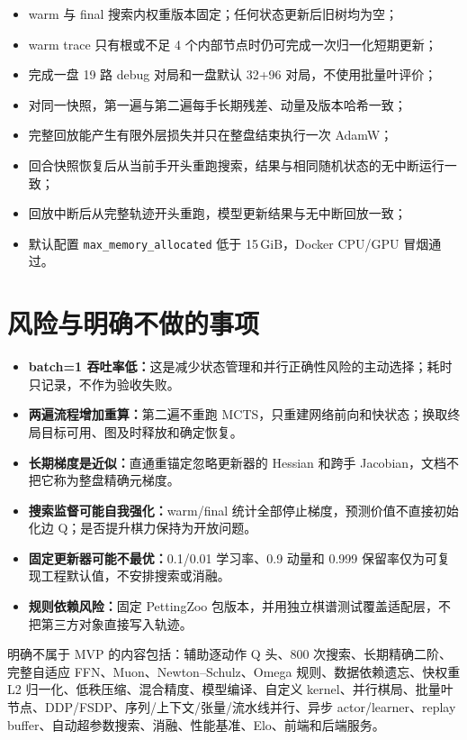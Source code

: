 \documentclass[UTF8,11pt,a4paper]{ctexart}
\newcommand{\code}[1]{\texttt{#1}}
\begin{document}
\begin{itemize}
  \item warm 与 final 搜索内权重版本固定；任何状态更新后旧树均为空；
  \item warm trace 只有根或不足 4 个内部节点时仍可完成一次归一化短期更新；
  \item 完成一盘 19 路 debug 对局和一盘默认 32+96 对局，不使用批量叶评价；
  \item 对同一快照，第一遍与第二遍每手长期残差、动量及版本哈希一致；
  \item 完整回放能产生有限外层损失并只在整盘结束执行一次 AdamW；
  \item 回合快照恢复后从当前手开头重跑搜索，结果与相同随机状态的无中断运行一致；
  \item 回放中断后从完整轨迹开头重跑，模型更新结果与无中断回放一致；
  \item 默认配置 \code{max\_memory\_allocated} 低于 15\,GiB，Docker CPU/GPU 冒烟通过。
\end{itemize}

\section{风险与明确不做的事项}

\begin{itemize}
  \item \textbf{batch=1 吞吐率低：}这是减少状态管理和并行正确性风险的主动选择；耗时只记录，不作为验收失败。
  \item \textbf{两遍流程增加重算：}第二遍不重跑 MCTS，只重建网络前向和快状态；换取终局目标可用、图及时释放和确定恢复。
  \item \textbf{长期梯度是近似：}直通重锚定忽略更新器的 Hessian 和跨手 Jacobian，文档不把它称为整盘精确元梯度。
  \item \textbf{搜索监督可能自我强化：}warm/final 统计全部停止梯度，预测价值不直接初始化边 Q；是否提升棋力保持为开放问题。
  \item \textbf{固定更新器可能不最优：}0.1/0.01 学习率、0.9 动量和 0.999 保留率仅为可复现工程默认值，不安排搜索或消融。
  \item \textbf{规则依赖风险：}固定 PettingZoo 包版本，并用独立棋谱测试覆盖适配层，不把第三方对象直接写入轨迹。
\end{itemize}

明确不属于 MVP 的内容包括：辅助逐动作 Q 头、800 次搜索、长期精确二阶、完整自适应 FFN、Muon、Newton--Schulz、Omega 规则、数据依赖遗忘、快权重 L2 归一化、低秩压缩、混合精度、模型编译、自定义 kernel、并行棋局、批量叶节点、DDP/FSDP、序列/上下文/张量/流水线并行、异步 actor/learner、replay buffer、自动超参数搜索、消融、性能基准、Elo、前端和后端服务。
\end{document}
